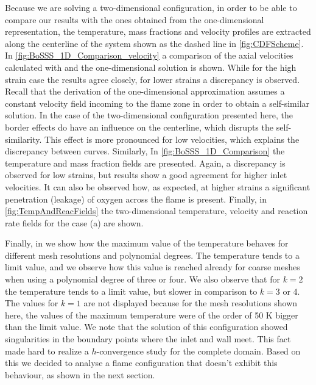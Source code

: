 Because we are solving a two-dimensional configuration, in order to be able to compare our results with the ones obtained from the one-dimensional representation, the temperature, mass fractions and velocity profiles are extracted along the centerline of the system shown as the dashed line in \cref{fig:CDFScheme}. In \cref{fig:BoSSS_1D_Comparison_velocity} a comparison of the axial velocities calculated with \BoSSS and the one-dimensional solution is shown. While for the high strain case the results agree closely, for lower strains a discrepancy is observed. Recall that the derivation of the one-dimensional approximation assumes a constant velocity field incoming to the flame zone in order to obtain a self-similar solution. In the case of the two-dimensional configuration presented here, the border effects do have an influence on the centerline, which disrupts the self-similarity. This effect is more pronounced for low velocities, which explains the discrepancy between curves. Similarly, In \cref{fig:BoSSS_1D_Comparison} the temperature and mass fraction fields are presented. Again, a discrepancy is observed for low strains, but results show a good agreement for higher inlet velocities. It can also be observed how, as expected, \cite{fernandez-tarrazoSimpleOnestepChemistry2006} at higher strains a significant penetration (leakage) of oxygen across the flame is present. Finally, in \cref{fig:TempAndReacFields} the two-dimensional temperature, velocity and reaction rate fields for the case (a) are shown. 

Finally, in  we show how the maximum value of the temperature behaves for different mesh resolutions and polynomial degrees. The temperature tends to a limit value, and we observe how this value is reached already for coarse meshes when using a polynomial degree of three or four. We also observe that for $k=2$ the temperature tends to a limit value, but slower in comparison to $k =3$ or $4$. The values for $k=1$ are not displayed because for the mesh resolutions shown here, the values of the maximum temperature were of the order of 50 \si{K} bigger than the limit value. We note that the solution of this configuration showed singularities in the boundary points where the inlet and wall meet. This fact made hard to realize a $h$-convergence study for the complete domain. Based on this we decided to analyse a flame configuration that doesn't exhibit this behaviour, as shown in the next section.

